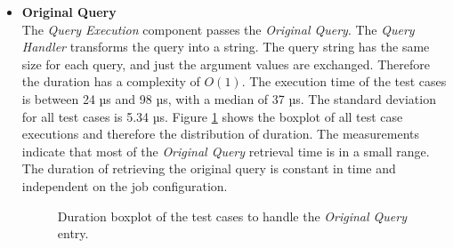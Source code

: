\documentclass[draft,final]{vutinfth} %
\newcommand{\bgoesswein}[1]{{\color{blue}#1}}
\begin{document}
\begin{itemize}
	\item \textbf{Original Query} \\
	The \textit{Query Execution} component passes the \textit{Original Query}. The \textit{Query Handler} transforms the query into a string. The query string has the same size for each query, and just the argument values are exchanged. Therefore the duration has a complexity of $O(1)$. The execution time of the test cases is between 24 µs and 98 µs, with a median of 37 µs. The standard deviation for all test cases is 5.34 µs. Figure \ref{fig:evaluation_perf_original} shows the boxplot of all test case executions and therefore the distribution of duration. The measurements indicate that most of the \textit{Original Query} retrieval time is in a small range. The duration of \bgoesswein{retrieving the original query} is constant in time and independent on the job configuration. 
	\begin{figure}[!h]
		\centering
		\caption{Duration boxplot of the test cases to handle the \textit{Original Query} entry.}
		\label{fig:evaluation_perf_original}
	\end{figure}


\end{itemize}
\end{document}
